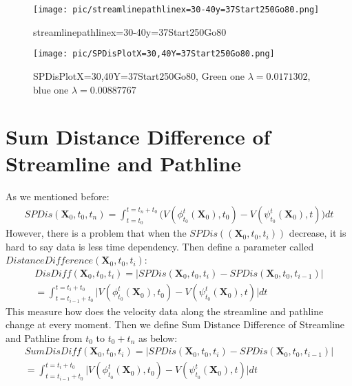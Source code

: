 \documentclass[
     11pt,         %
     a4paper,      %
     oneside,
     ]{article}
\newcommand{\vect}[1]{\boldsymbol{#1}}
\begin{document}
					
					
					\begin{figure}[H]
						\centering
						\begin{minipage}{0.45\textwidth}
							\centering
							\texttt{[image: pic/streamlinepathlinex=30-40y=37Start250Go80.png]}
							\caption{\tiny streamlinepathlinex=30-40y=37Start250Go80 }
							\label{fig:streamlinepathlinex=30-40y=37Start250Go80}
						\end{minipage}
						\begin{minipage}{0.45\textwidth}
							\centering
							\texttt{[image: pic/SPDisPlotX=30,40Y=37Start250Go80.png]}
							\caption{\tiny SPDisPlotX=30,40Y=37Start250Go80, Green one $\lambda=0.0171302$, blue one $\lambda=0.00887767$}
							\label{fig:SPDisPlotX=30,40Y=37Start250Go80}
						\end{minipage}
						
					\end{figure}
	
	


\section{Sum Distance Difference of Streamline and Pathline}
As we mentioned before:
\begin{eqnarray}
	SPDis(\vect{X}_{0},t_{0},t_{n})=\int_{t=t_{0}}^{t=t_{n}+t_{0}}\biggr( V(\phi_{t_{0}}^{t}(\vect{X}_{0}),t_{0})-V(\psi_{t_{0}}^{t}(\vect{X}_{0}),t)\biggr) dt
\end{eqnarray}
However, there is a problem that when the $SPDis((\vect{X}_{0},t_{0},t_{i}))$ decrease, it is hard to say data is less time dependency. Then define a parameter called $Distance Difference(\vect{X}_{0},t_{0},t_{i})$:
\begin{eqnarray}
DisDiff(\vect{X}_{0},t_{0},t_{i})=\biggr\lvert SPDis(\vect{X}_{0},t_{0},t_{i})-SPDis(\vect{X}_{0},t_{0},t_{i-1})\biggr\rvert\\
=\int_{t=t_{i-1}+t_{0}}^{t=t_{i}+t_{0}}\biggr\lvert V(\phi_{t_{0}}^{t}(\vect{X}_{0}),t_{0})-V(\psi_{t_{0}}^{t}(\vect{X}_{0}),t)\biggr\rvert dt
\end{eqnarray}
This measure how does the velocity data along the streamline and pathline change at every moment. Then we define Sum Distance Difference of Streamline and Pathline from $t_{0}$ to $t_{0}+t_{n}$ as below:
 \begin{eqnarray}
 SumDisDiff(\vect{X}_{0},t_{0},t_{i})=\biggr\lvert SPDis(\vect{X}_{0},t_{0},t_{i})-SPDis(\vect{X}_{0},t_{0},t_{i-1})\biggr\rvert\\
 =\int_{t=t_{i-1}+t_{0}}^{t=t_{i}+t_{0}}\biggr\lvert V(\phi_{t_{0}}^{t}(\vect{X}_{0}),t_{0})-V(\psi_{t_{0}}^{t}(\vect{X}_{0}),t)\biggr\rvert dt
 \end{eqnarray}
 
\end{document}

